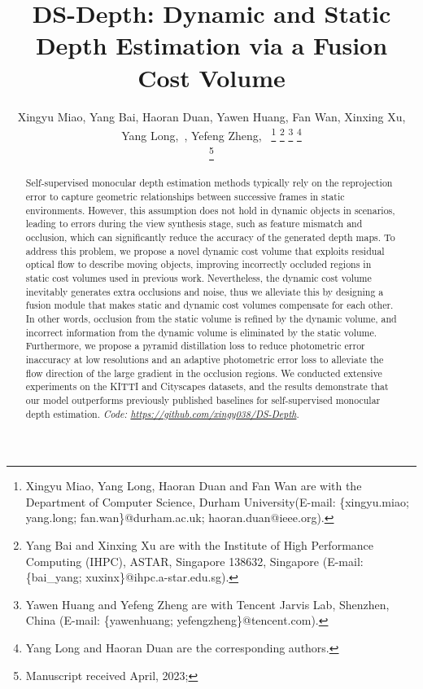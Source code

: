 \documentclass[journal]{IEEEtran}
\begin{document}
\title{DS-Depth: Dynamic and Static Depth Estimation via a Fusion Cost Volume}

\author{Xingyu Miao, Yang Bai, Haoran Duan, Yawen Huang, Fan Wan, Xinxing Xu, \\ Yang Long,~, Yefeng Zheng,~
\thanks{Xingyu Miao, Yang Long, Haoran Duan and Fan Wan are with the Department of Computer Science, Durham University(E-mail: \{xingyu.miao; yang.long; fan.wan\}@durham.ac.uk; haoran.duan@ieee.org).}
\thanks{Yang Bai and Xinxing Xu are with the Institute of High Performance Computing (IHPC),
ASTAR, Singapore 138632, Singapore (E-mail: \{bai\_yang; xuxinx\}@ihpc.a-star.edu.sg).}
\thanks{Yawen Huang and Yefeng Zheng are with Tencent Jarvis Lab, Shenzhen, China (E-mail: \{yawenhuang; yefengzheng\}@tencent.com).}
\thanks{Yang Long and Haoran Duan are the corresponding authors.}

\thanks{Manuscript received April, 2023;}}




\maketitle

\begin{abstract}
Self-supervised monocular depth estimation methods typically rely on the reprojection error to capture geometric relationships between successive frames in static environments. However, this assumption does not hold in dynamic objects in scenarios, leading to errors during the view synthesis stage, such as feature mismatch and occlusion, which can significantly reduce the accuracy of the generated depth maps. To address this problem, we propose a novel dynamic cost volume that exploits residual optical flow to describe moving objects, improving incorrectly occluded regions in static cost volumes used in previous work. Nevertheless, the dynamic cost volume inevitably generates extra occlusions and noise, thus we alleviate this by designing a fusion module that makes static and dynamic cost volumes compensate for each other. In other words, occlusion from the static volume is refined by the dynamic volume, and incorrect information from the dynamic volume is eliminated by the static volume. Furthermore, we propose a pyramid distillation loss to reduce photometric error inaccuracy at low resolutions and an adaptive photometric error loss to alleviate the flow direction of the large gradient in the occlusion regions. We conducted extensive experiments on the KITTI and Cityscapes datasets, and the results demonstrate that our model outperforms previously published baselines for self-supervised monocular depth estimation. 
\textit{Code: \url{https://github.com/xingy038/DS-Depth}}.
\end{abstract}
\end{document}
